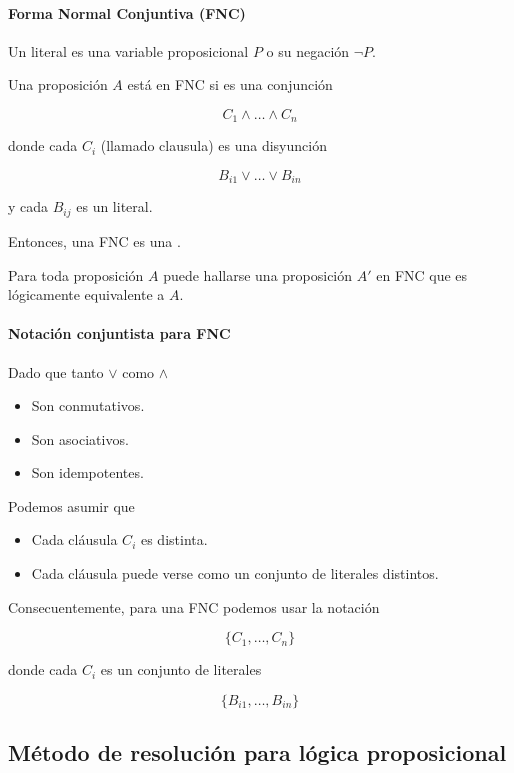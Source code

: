 \paragraph{Forma Normal Conjuntiva (FNC)}

Un literal es una variable proposicional $P$ o su negación $\lnot P$.

Una proposición $A$ está en FNC si es una conjunción

\[C_1 \land \dots \land C_n\]

donde cada $C_i$ (llamado clausula) es una disyunción

\[B_{i1} \lor \dots \lor B_{in}\]

y cada $B_{ij}$ es un literal.

Entonces, una FNC es una .

\begin{teo}
  Para toda proposición $A$ puede hallarse una proposición $A'$ en FNC que es lógicamente equivalente a $A$.
\end{teo}

\paragraph{Notación conjuntista para FNC}

Dado que tanto $\lor$ como $\land$
\begin{itemize}
  \item Son conmutativos.
  \item Son asociativos.
  \item Son idempotentes.
\end{itemize}

Podemos asumir que
\begin{itemize}
  \item Cada cláusula $C_i$ es distinta.
  \item Cada cláusula puede verse como un conjunto de literales distintos.
\end{itemize}

Consecuentemente, para una FNC podemos usar la notación

\[\{C_1, \dots, C_n\}\]

donde cada $C_i$ es un conjunto de literales

\[\{B_{i1}, \dots, B_{in}\}\]

\subsection{Método de resolución para lógica proposicional}


